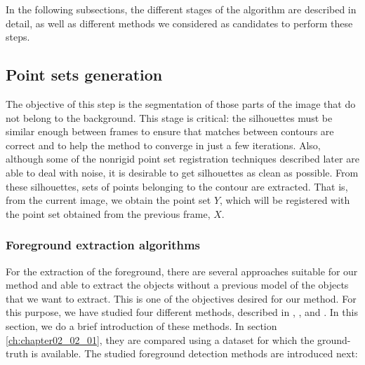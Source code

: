 In the following subsections, the different stages of the algorithm are described in detail, as well as different methods we considered as candidates to perform these steps.

\subsection{Point sets generation}\label{ch:chapter02_01_01}

The objective of this step is the segmentation of those parts of the image that do not belong to the background. This stage is critical: the silhouettes must be similar enough between frames to ensure that matches between contours are correct and to help the method to converge in just a few iterations. Also, although some of the nonrigid point set registration techniques described later are able to deal with noise, it is desirable to get silhouettes as clean as possible. From these silhouettes, sets of points belonging to the contour are extracted. That is, from the current image, we obtain the point set $Y$, which will be registered with the point set obtained from the previous frame, $X$.

\subsubsection{Foreground extraction algorithms}\label{ch:chapter02_01_01_01}

For the extraction of the foreground, there are several approaches suitable for our method and able to extract the objects without a previous model of the objects that we want to extract. This is one of the objectives desired for our method. For this purpose, we have studied four different methods, described in \cite{lopez2011stochastic}, \cite{lopez2011foreground}, \cite{guo2011hierarchical} and \cite{reddy2012improved}. In this section, we do a brief introduction of these methods. In section \ref{ch:chapter02_02_01}, they are compared using a dataset for which the ground-truth is available.
The studied foreground detection methods are introduced next:

